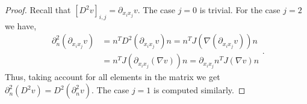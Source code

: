 \begin{proof}

        Recall that $\left[ D^2 v \right]_{i,j} = \partial _{x_{i}x_{j}} v $. The case $j=0$ is trivial. For the case $j=2$ we have,
        \begin{equation}
                \begin{split}
                \partial^{2} _{n} (\partial _{x_{i} x_{j}} v) & = n^{T}  D^2(\partial _{x_{i} x_{j}} v) n = n^{T}  J( \nabla (\partial _{x_{i} x_{j}}v) ) n \\
                & =  n^{T}  J(\partial _{x_{i} x_{j}}(\nabla v) ) n = \partial _{x_{i} x_{j}} n^{T} J(\nabla v) n
                \end{split}.
        \end{equation}
            Thus, taking account for all elements in the matrix we get $\partial^{2} _{n} (D^2v) = D^2( \partial^{2} _{n}v)$. The case $j=1$ is computed similarly.

\end{proof}


